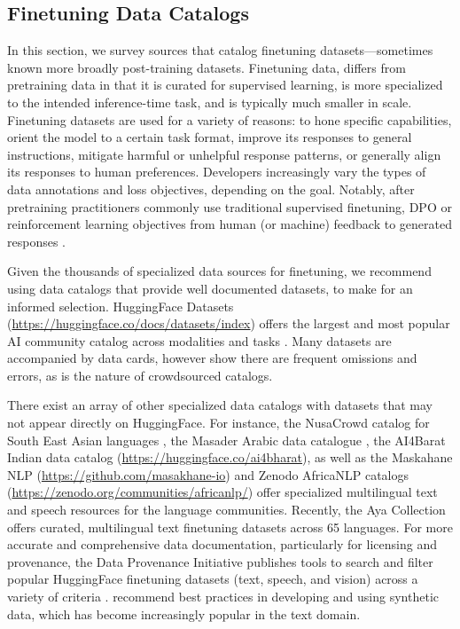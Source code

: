 % 


% 





\subsection{Finetuning Data Catalogs}
\label{sec:finetune}
\vspace{-2mm}

In this section, we survey sources that catalog finetuning datasets---sometimes known more broadly post-training datasets.
Finetuning data, differs from pretraining data in that it is curated for supervised learning, is more specialized to the intended inference-time task, and is typically much smaller in scale.
Finetuning datasets are used for a variety of reasons: to hone specific capabilities, orient the model to a certain task format, improve its responses to general instructions, mitigate harmful or unhelpful response patterns, or generally align its responses to human preferences.
Developers increasingly vary the types of data annotations and loss objectives, depending on the goal.
Notably, after pretraining practitioners commonly use traditional supervised finetuning, DPO \citep{rafailov2023direct} or reinforcement learning objectives from human (or machine) feedback to generated responses \citep{ouyang2022training, bai-constitutional-2022}.

Given the thousands of specialized data sources for finetuning, we recommend using data catalogs that provide well documented datasets, to make for an informed selection.
HuggingFace Datasets (\url{https://huggingface.co/docs/datasets/index}) offers the largest and most popular AI community catalog across modalities and tasks \citep{lhoest2021datasets}.
Many datasets are accompanied by data cards, however \citet{longpre2023data} show there are frequent omissions and errors, as is the nature of crowdsourced catalogs.

There exist an array of other specialized data catalogs with datasets that may not appear directly on HuggingFace.
For instance, the NusaCrowd catalog for South East Asian languages \citep{cahyawijayanusacrowd}, the Masader Arabic data catalogue \citep{alyafeai2022masader}, the AI4Barat Indian data catalog (\url{https://huggingface.co/ai4bharat}), as well as the Maskahane NLP (\url{https://github.com/masakhane-io}) and Zenodo AfricaNLP catalogs (\url{https://zenodo.org/communities/africanlp/}) offer specialized multilingual text and speech resources for the language communities.
Recently, the Aya Collection \citep{singh2024aya} offers curated, multilingual text finetuning datasets across 65 languages.
For more accurate and comprehensive data documentation, particularly for licensing and provenance, the Data Provenance Initiative publishes tools to search and filter popular HuggingFace finetuning datasets (text, speech, and vision) across a variety of criteria \citep{longpre2023data}.
\citet{liu2024best} recommend best practices in developing and using synthetic data, which has become increasingly popular in the text domain.

